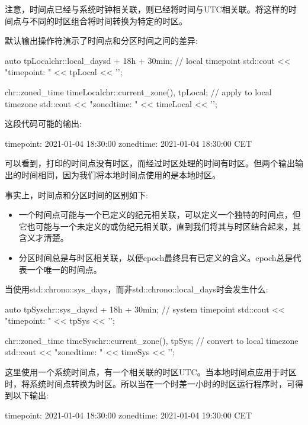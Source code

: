 注意，时间点已经与系统时钟相关联，则已经将时间与UTC相关联。将这样的时间点与不同的时区组合将时间转换为特定的时区。

默认输出操作符演示了时间点和分区时间之间的差异:

\begin{cpp}
auto tpLocal{chr::local_days{d} + 18h + 30min}; // local timepoint
std::cout << "timepoint: " << tpLocal << '\n';

chr::zoned_time timeLocal{chr::current_zone(), tpLocal}; // apply to local timezone
std::cout << "zonedtime: " << timeLocal << '\n';
\end{cpp}

这段代码可能的输出:

\begin{shell}
timepoint: 2021-01-04 18:30:00
zonedtime: 2021-01-04 18:30:00 CET
\end{shell}

可以看到，打印的时间点没有时区，而经过时区处理的时间有时区。但两个输出输出的时间相同，因为我们将本地时间点使用的是本地时区。

事实上，时间点和分区时间的区别如下:

\begin{itemize}
\item 
一个时间点可能与一个已定义的纪元相关联，可以定义一个独特的时间点，但它也可能与一个未定义的或伪纪元相关联，直到我们将其与时区结合起来，其含义才清楚。

\item 
分区时间总是与时区相关联，以便epoch最终具有已定义的含义。epoch总是代表一个唯一的时间点。
\end{itemize}

当使用std::chrono::sys\_days，而非std::chrono::local\_days时会发生什么:

\begin{cpp}
auto tpSys{chr::sys_days{d} + 18h + 30min}; // system timepoint
std::cout << "timepoint: " << tpSys << '\n';

chr::zoned_time timeSys{chr::current_zone(), tpSys}; // convert to local timezone
std::cout << "zonedtime: " << timeSys << '\n';
\end{cpp}

这里使用一个系统时间点，有一个相关联的时区UTC。当本地时间点应用于时区时，将系统时间点转换为时区。所以当在一个时差一小时的时区运行程序时，可得到以下输出:

\begin{shell}
timepoint: 2021-01-04 18:30:00
zonedtime: 2021-01-04 19:30:00 CET
\end{shell}


